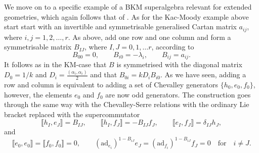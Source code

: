 We move on to a specific example of a BKM superalgebra relevant for extended geometries, which again follows that of \cite{CederwallPalmkvist2017}. As for the Kac-Moody example above start start with an invertible and symmetrisable generalised Cartan matrix $a_{ij}$, where $i,j=1,2,\ldots,r$. As above, add one row and one column and form a symmetrisable matrix $B_{IJ}$, where $I,J=0,1,\ldots r$, according to 
\begin{equation}
    B_{00} = 0,\qquad B_{i0} = -\lambda_i,\qquad B_{ij} = a_{ij}.
\end{equation}
It follows as in the KM-case that $B$ is symmetrised with the diagonal matrix $D_0=1/k$ and $D_i=\frac{(\alpha_i,\alpha_i)}{2}$ and that $B_{0i}=kD_iB_{i0}$. As we have seen, adding a row and column is equivalent to adding a set of Chevalley generators $\{h_0,e_0,f_0\}$, however, the elements $e_0$ and $f_0$ are now odd generators. The construction goes through the same way with the Chevalley-Serre relations with the ordinary Lie bracket replaced with the supercommutator 
\begin{equation}
    \llbracket h_I,e_J\rrbracket = B_{IJ},\qquad \llbracket h_I,f_J\rrbracket = -B_{IJ}f_J,\qquad \llbracket e_I,f_J\rrbracket = \delta_{IJ}h_J,
\end{equation}
and 
\begin{equation}
    \llbracket e_0,e_0\rrbracket = \llbracket f_0,f_0\rrbracket = 0,\qquad (\text{ad}_{e_i})^{1-B_{iJ}}e_J = (\text{ad}_{f_i})^{1-B_{iJ}}f_J = 0 \quad \text{for} \quad i\neq J.
\end{equation}


